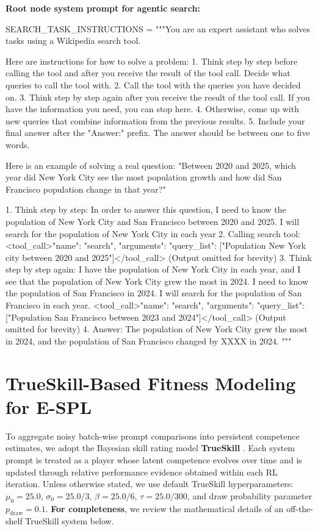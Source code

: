 \documentclass{article}
\theoremstyle{plain}
\theoremstyle{definition}
\theoremstyle{remark}
\begin{document}
\textbf{Root node system prompt for agentic search:}
\begin{WrapVerbatim}
SEARCH_TASK_INSTRUCTIONS = """You are an expert assistant who solves tasks using a Wikipedia search tool.

Here are instructions for how to solve a problem:
1. Think step by step before calling the tool and after you receive the result of the tool call. Decide what queries to call the tool with.
2. Call the tool with the queries you have decided on.
3. Think step by step again after you receive the result of the tool call. If you have the information you need, you can stop here.
4. Otherwise, come up with new queries that combine information from the previous results.
5. Include your final answer after the "Answer:" prefix. The answer should be between one to five words.

Here is an example of solving a real question:
"Between 2020 and 2025, which year did New York City see the most population growth and how did San Francisco population change in that year?"

1. Think step by step: In order to answer this question, I need to know the population of New York City and San Francisco between 2020 and 2025. I will search for the population of New York City in each year
2. Calling search tool: <tool_call>{"name": "search", "arguments": {"query_list": ["Population New York city between 2020 and 2025"]}}</tool_call> (Output omitted for brevity)
3. Think step by step again: I have the population of New York City in each year, and I see that the population of New York City grew the most in 2024. I need to know the population of San Francisco in 2024. I will search for the population of San Francisco in each year.
<tool_call>{"name": "search", "arguments": {"query_list": ["Population San Francisco between 2023 and 2024"]}}</tool_call> (Output omitted for brevity)
4. Answer: The population of New York City grew the most in 2024, and the population of San Francisco changed by XXXX in 2024.
"""
\end{WrapVerbatim}

\clearpage
\newpage


\section{TrueSkill-Based Fitness Modeling for E-SPL}
\label{sec:appendix-trueskill}

To aggregate noisy batch-wise prompt comparisons into persistent competence estimates, we adopt the Bayesian skill rating model \textbf{TrueSkill} \cite{trueskill}. Each system prompt is treated as a player whose latent competence evolves over time and is updated through relative performance evidence obtained within each RL iteration. Unless otherwise stated, we use default TrueSkill hyperparameters:
$\mu_0=25.0$, $\sigma_0=25.0/3$, $\beta=25.0/6$, $\tau=25.0/300$, and draw probability parameter $p_{\text{draw}}=0.1$. \textbf{For completeness}, we review the mathematical details of an {off-the-shelf} TrueSkill system below.
\end{document}
